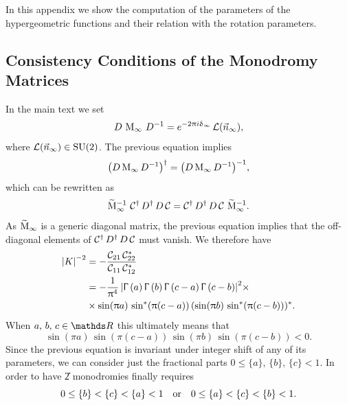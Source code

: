 In this appendix we show the computation of the parameters of the hypergeometric functions and their relation with the rotation parameters.


\subsection{Consistency Conditions of the Monodromy Matrices}

In the main text we set
\begin{equation}
  D~
  \mathrm{M}_{\infty}~
  D^{-1}
  =
  e^{-2\uppi i \updelta_{\infty}}\,
  \mathcal{L}(\vec{n}_{\infty}),
\end{equation}
where $\mathcal{L}(\vec{n}_{\infty}) \in \mathrm{SU}(2)$.
The previous equation implies
\begin{equation}
  \qty( D\, \mathrm{M}_{\infty}\, D^{-1} )^\dagger
  =
  \qty( D\, \mathrm{M}_{\infty}\, D^{-1} )^{-1},
\end{equation}
which can be rewritten as
\begin{equation}
  \widetilde{\mathrm{M}}_{\infty}^{-1}~
  \mathcal{C}^{\dagger}\, D^{\dagger}\, D\, \mathcal{C}
  =
  \mathcal{C}^{\dagger}\, D^{\dagger}\, D\, \mathcal{C}~
  \widetilde{\mathrm{M}}_{\infty}^{-1}.
\end{equation}
As $\widetilde{\mathrm{M}}_{\infty}$ is a generic diagonal matrix, the previous equation implies that the off-diagonal elements of $\mathcal{C}^{\dagger}\, D^{\dagger}\, D\, \mathcal{C}$ must vanish.
We therefore have
\begin{equation}
  \begin{split}
    \abs{K}^{-2}
    & =
    -\frac{\mathcal{C}_{21}\, \mathcal{C}^*_{22}}{\mathcal{C}_{11}\, \mathcal{C}^*_{12}}
    \\
    & =
    -\frac{1}{\uppi^4}\,
    \abs{\Upgamma\left( a \right) \Upgamma\left( b \right) \Upgamma\left( c-a \right) \Upgamma\left( c-b \right)}^2 \times
    \\
    & \times
    \sin(\uppi a)\, \sin^*(\uppi (c-a))\, (\sin(\uppi b)\, \sin^*(\uppi (c-b)))^*.
  \end{split}
\end{equation}
When $a,\, b,\, c \in \R$ this ultimately means that
\begin{equation}
  \sin(\pi a)\, \sin(\pi (c-a))\, \sin(\pi b)\, \sin(\pi (c-b)) < 0.
  \label{eq:constraint_from_K^2}
\end{equation}
Since the previous equation is invariant under integer shift of any of its parameters, we can consider just the fractional parts $0 \le \{a\},\, \{b\},\, \{c\} < 1$.
In order to have \U{2} monodromies finally requires
\begin{equation}
  0 \le \{b\} < \{c\} < \{a\} < 1
  \qq{or}
  0 \le \{a\} < \{c\} < \{b\} <1.
  \label{eq:K_consistency_condition}
\end{equation}

